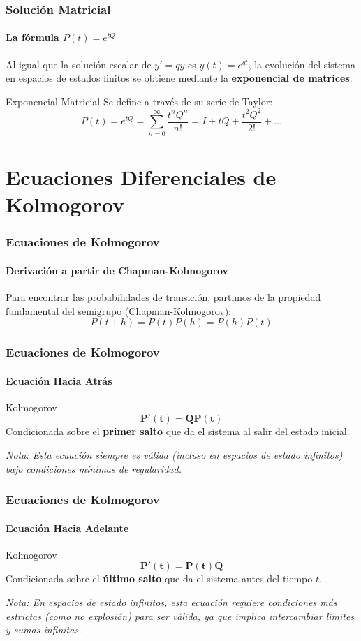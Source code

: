 \documentclass{beamer}
\begin{document}
\begin{frame}
\frametitle{Solución Matricial}
\framesubtitle{La fórmula $P(t) = e^{tQ}$}

Al igual que la solución escalar de $y' = qy$ es $y(t) = e^{qt}$, la evolución del sistema en espacios de estados finitos se obtiene mediante la \textbf{exponencial de matrices}.

\begin{block}{Exponencial Matricial}
Se define a través de su serie de Taylor:
\[ P(t) = e^{tQ} = \sum_{n=0}^\infty \frac{t^n Q^n}{n!} = I + tQ + \frac{t^2 Q^2}{2!} + \dots \]
\end{block}
\end{frame}


\section{Ecuaciones Diferenciales de Kolmogorov}
\begin{frame}
\frametitle{Ecuaciones de Kolmogorov}
\framesubtitle{Derivación a partir de Chapman-Kolmogorov}

Para encontrar las probabilidades de transición, partimos de la propiedad fundamental del semigrupo (Chapman-Kolmogorov):
\[ P(t+h) = P(t)P(h) = P(h)P(t) \]

\end{frame}


\begin{frame}
\frametitle{Ecuaciones de Kolmogorov}
\framesubtitle{Ecuación Hacia Atrás }


\begin{block}{Kolmogorov}
\[ \mathbf{P'(t) = Q P(t)} \]
Condicionada sobre el \textbf{primer salto} que da el sistema al salir del estado inicial.
\end{block}

\vspace{0.2cm}
\footnotesize{\textit{Nota: Esta ecuación siempre es válida (incluso en espacios de estado infinitos) bajo condiciones mínimas de regularidad.}}
\end{frame}

\begin{frame}
\frametitle{Ecuaciones de Kolmogorov}
\framesubtitle{Ecuación Hacia Adelante}

\begin{block}{Kolmogorov }
\[ \mathbf{P'(t) = P(t) Q} \]
Condicionada sobre el \textbf{último salto} que da el sistema antes del tiempo $t$.
\end{block}

\vspace{0.2cm}
\footnotesize{\textit{Nota: En espacios de estado infinitos, esta ecuación requiere condiciones más estrictas (como no explosión) para ser válida, ya que implica intercambiar límites y sumas infinitas.}}
\end{frame}
\end{document}

